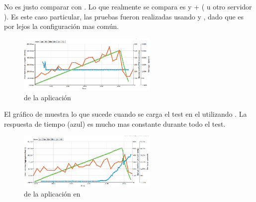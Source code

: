 No es justo comparar \nodejsNAME con \phpNAME. Lo que realmente se compara es \nodejsNAME y \phpNAME + \apacheDosNAME ( u otro servidor \httpNAME ). Es este caso particular, las pruebas fueron realizadas usando \apacheDosNAME y \modPhpNAME, dado que es por lejos la configuración mas común. 

\begin{figure}[H]
	\centering
	\includegraphics[width=0.6\textwidth]{figuras/cap2/node_benchmak_loadimpact.png}
	\caption{\performanceQA de la aplicación \nodejsNAME}
	\label{figure:node_benchmark_nodephp}
\end{figure}

El gráfico de  muestra lo que sucede cuando se carga el test en el \serverAS utilizando \nodejsNAME. La respuesta de tiempo (azul) es mucho mas constante durante todo el test. 



\begin{figure}[H]
	\centering
	\includegraphics[width=0.6\textwidth]{figuras/cap2/phpapache_benchmak_loadimpact.png}
	\caption{\performanceQA de la aplicación en \phpApacheNAME}
	\label{figure:php_benchmark_nodephp}
\end{figure}

